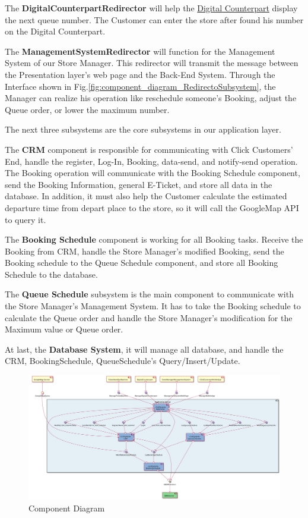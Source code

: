 \documentclass[a4paper,12pt]{report}
\begin{document}
The \textbf{DigitalCounterpartRedirector} will help the \hyperref[subsec:definitions]{Digital Counterpart} display the next queue number.
The Customer can enter the store after found his number on the Digital Counterpart.

The \textbf{ManagementSystemRedirector} will function for the Management System of our Store Manager.
This redirector will transmit the message between the Presentation layer's web page and the Back-End System.
Through the Interface shown in Fig.\ref{fig:component_diagram_RedirectoSubsystem}, the Manager can realize his operation like reschedule someone's Booking, adjust the Queue order, or lower the maximum number.

The next three subsystems are the core subsystems in our application layer.

The \textbf{CRM} component is responsible for communicating with Click Customers' End, handle the register, Log-In, Booking, data-send, and notify-send operation.
The Booking operation will communicate with the Booking Schedule component, send the Booking Information, general E-Ticket, and store all data in the database.
In addition, it must also help the Customer calculate the estimated departure time from depart place to the store, so it will call the GoogleMap API to query it.

The \textbf{Booking Schedule} component is working for all Booking tasks.
Receive the Booking from CRM, handle the Store Manager's modified Booking, send the Booking schedule to the Queue Schedule component, and store all Booking Schedule to the database.

The \textbf{Queue Schedule} subsystem is the main component to communicate with the Store Manager's Management System.
It has to take the Booking schedule to calculate the Queue order and handle the Store Manager's modification for the Maximum value or Queue order.

At last, the \textbf{Database System}, it will manage all database, and handle the CRM, BookingSchedule, QueueSchedule's Query/Insert/Update.


\begin{figure}
	\includegraphics[width=1.25\textwidth]{component_diagram}
	\centering
	\caption{Component Diagram}
	\label{fig:ComponentDiagram}
\end{figure}
\end{document}
